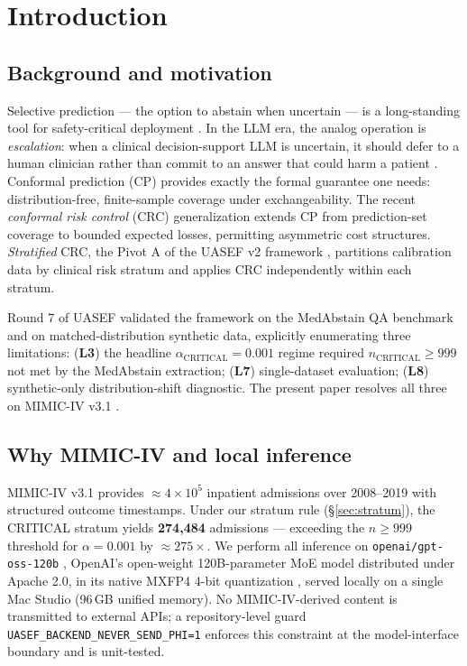 \documentclass[11pt,letterpaper]{article}
\begin{document}
\section{Introduction}

\subsection{Background and motivation}
Selective prediction --- the option to abstain when uncertain --- is a
long-standing tool for safety-critical deployment \cite{ElYanivWiener2010}.
In the LLM era, the analog operation is \emph{escalation}: when a clinical
decision-support LLM is uncertain, it should defer to a human clinician
rather than commit to an answer that could harm a patient
\cite{Savage2025,Singhal2023}. Conformal prediction (CP)
\cite{VovkBookshelf2005,AngelopoulosBates2021} provides exactly the
formal guarantee one needs: distribution-free, finite-sample coverage under
exchangeability. The recent \emph{conformal risk control} (CRC)
generalization \cite{Angelopoulos2024CRC} extends CP from prediction-set
coverage to bounded expected losses, permitting asymmetric cost structures.
\emph{Stratified} CRC, the Pivot A of the UASEF v2 framework
\cite{AnonUASEFR7}, partitions calibration data by clinical risk stratum
and applies CRC independently within each stratum.

Round 7 of UASEF \cite{AnonUASEFR7} validated the framework on the MedAbstain
QA benchmark \cite{Machcha2026} and on matched-distribution synthetic data,
explicitly enumerating three limitations: (\textbf{L3}) the headline
$\alpha_{\text{CRITICAL}} = 0.001$ regime required $n_{\text{CRITICAL}} \ge
999$ not met by the MedAbstain extraction; (\textbf{L7}) single-dataset
evaluation; (\textbf{L8}) synthetic-only distribution-shift diagnostic. The
present paper resolves all three on MIMIC-IV v3.1 \cite{MIMICIVv31}.

\subsection{Why MIMIC-IV and local inference}
MIMIC-IV v3.1 provides $\approx 4 \times 10^5$ inpatient admissions over
2008--2019 with structured outcome timestamps. Under our stratum rule
(\S\ref{sec:stratum}), the CRITICAL stratum yields \textbf{274{,}484}
admissions --- exceeding the $n \ge 999$ threshold for $\alpha = 0.001$ by
$\approx 275\times$. We perform all inference on \texttt{openai/gpt-oss-120b}
\cite{GptOss2025}, OpenAI's open-weight 120B-parameter MoE model
distributed under Apache 2.0, in its native MXFP4 4-bit quantization
\cite{FrantarGPTQ2022}, served locally on a single Mac Studio (96\,GB
unified memory). No MIMIC-IV-derived content is transmitted to external
APIs; a repository-level guard \texttt{UASEF\_BACKEND\_NEVER\_SEND\_PHI=1}
enforces this constraint at the model-interface boundary and is
unit-tested.
\end{document}

